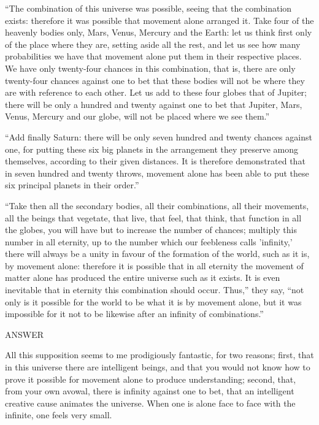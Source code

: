 \enquote{The combination of this universe was possible, seeing that the
combination exists: therefore it was possible that movement alone
arranged it. Take four of the heavenly bodies only, Mars, Venus, Mercury
and the Earth: let us think first only of the place where they are,
setting aside all the rest, and let us see how many probabilities we
have that movement alone put them in their respective places. We have
only twenty-four chances in this combination, that is, there are only
twenty-four chances against one to bet that these bodies will not be
where they are with reference to each other. Let us add to these four
globes that of Jupiter; there will be only a hundred and twenty against
one to bet that Jupiter, Mars, Venus, Mercury and our globe, will not be
placed where we see them.}

\enquote{Add finally Saturn: there will be only seven hundred and twenty chances
against one, for putting these six big planets in the arrangement they
preserve among themselves, according to their given distances. It is
therefore demonstrated that in seven hundred and twenty throws,
movement alone has been able to put these six principal planets in their
order.}

\enquote{Take then all the secondary bodies, all their combinations, all their
movements, all the beings that vegetate, that live, that feel, that
think, that function in all the globes, you will have but to increase
the number of chances; multiply this number in all eternity, up to the
number which our feebleness calls 'infinity,' there will always be a
unity in favour of the formation of the world, such as it is, by
movement alone: therefore it is possible that in all eternity the
movement of matter alone has produced the entire universe such as it
exists. It is even inevitable that in eternity this combination should
occur. Thus,} they say, \enquote{not only is it possible for the world to be
what it is by movement alone, but it was impossible for it not to be
likewise after an infinity of combinations.}

ANSWER

All this supposition seems to me prodigiously fantastic, for two
reasons; first, that in this universe there are intelligent beings, and
that you would not know how to prove it possible for movement alone to
produce understanding; second, that, from your own avowal, there is
infinity against one to bet, that an intelligent creative cause animates
the universe. When one is alone face to face with the infinite, one
feels very small.

